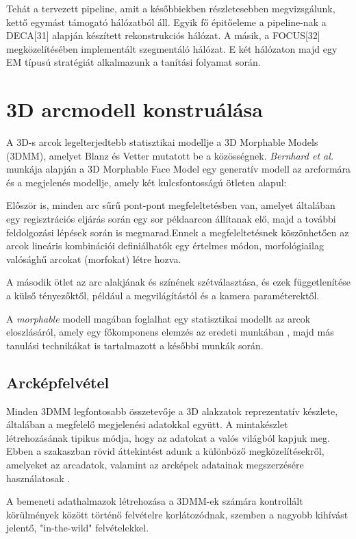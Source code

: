 \documentclass[12pt,a4]{article}
\begin{document}
 	Tehát a tervezett pipeline, amit a későbbiekben részletesebben
 	megvizsgálunk, kettő egymást támogató hálózatból áll. Egyik fő épitőeleme a
 	pipeline-nak a DECA[31] alapján készített rekonstrukciós hálózat. A másik,
 	a FOCUS[32] megközelítésében implementált szegmentáló hálózat. E két
 	hálózaton majd egy EM típusú stratégiát alkalmazunk a tanítási folyamat
 	során.
 	
 
	 \section{3D arcmodell konstruálása}
	 \label{3d}
	 \cite{survey} A 3D-s arcok legelterjedtebb statisztikai modellje a 3D Morphable Models (3DMM), amelyet Blanz és Vetter \cite{blanzvetter} mutatott be a közösségnek. \textit{Bernhard et al.} \cite{3dmm} munkája alapján a 3D Morphable Face Model egy generatív modell az arcformára
	 és a megjelenés modellje, amely két kulcsfontosságú ötleten alapul:
	 
	  Először is, minden arc
	 sűrű pont-pont megfeleltetésben van, amelyet általában egy regisztrációs eljárás során egy sor példaarcon állítanak elő, majd
	 a további feldolgozási lépések során is megmarad.Ennek a megfeleltetésnek köszönhetően az arcok lineáris kombinációi definiálhatók egy értelmes módon, morfológiailag valósághű arcokat (morfokat) létre hozva.
	 
	 
	 A második ötlet az arc alakjának és színének szétválasztása, és ezek függetlenítése a külső tényezőktől, például a megvilágítástól és a kamera paraméterektől.
	 
	  A \textit{morphable} modell magában foglalhat egy statisztikai modellt
	 az arcok eloszlásáról, amely egy főkomponens elemzés az eredeti munkában \cite{blanzvetter}, majd más
	 tanulási technikákat is tartalmazott a későbbi munkák során.
	 
	 \subsection{Arcképfelvétel}
	  Minden 3DMM legfontosabb összetevője a 3D alakzatok reprezentatív készlete, általában a megfelelő megjelenési adatokkal együtt. A mintakészlet létrehozásának tipikus módja, hogy az adatokat a valós világból kapjuk meg. Ebben a szakaszban rövid áttekintést adunk a különböző megközelítésekről, amelyeket az arcadatok, valamint az arcképek adatainak megszerzésére használatosak \cite{3dmm}.
	  
	 A bemeneti adathalmazok létrehozása a 3DMM-ek számára kontrollált körülmények között történő felvételre korlátozódnak, szemben a nagyobb kihívást jelentő, "in-the-wild" felvételekkel.
	 
\end{document}
